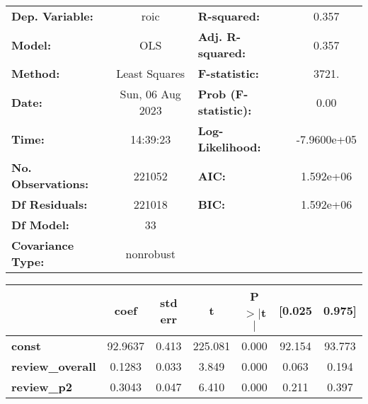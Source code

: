 \begin{center}
\begin{tabular}{lclc}
\toprule
\textbf{Dep. Variable:}                                               &       roic       & \textbf{  R-squared:         } &      0.357   \\
\textbf{Model:}                                                       &       OLS        & \textbf{  Adj. R-squared:    } &      0.357   \\
\textbf{Method:}                                                      &  Least Squares   & \textbf{  F-statistic:       } &      3721.   \\
\textbf{Date:}                                                        & Sun, 06 Aug 2023 & \textbf{  Prob (F-statistic):} &      0.00    \\
\textbf{Time:}                                                        &     14:39:23     & \textbf{  Log-Likelihood:    } & -7.9600e+05  \\
\textbf{No. Observations:}                                            &      221052      & \textbf{  AIC:               } &  1.592e+06   \\
\textbf{Df Residuals:}                                                &      221018      & \textbf{  BIC:               } &  1.592e+06   \\
\textbf{Df Model:}                                                    &          33      & \textbf{                     } &              \\
\textbf{Covariance Type:}                                             &    nonrobust     & \textbf{                     } &              \\
\bottomrule
\end{tabular}
\begin{tabular}{lcccccc}
                                                                      & \textbf{coef} & \textbf{std err} & \textbf{t} & \textbf{P$> |$t$|$} & \textbf{[0.025} & \textbf{0.975]}  \\
\midrule
\textbf{const}                                                        &      92.9637  &        0.413     &   225.081  &         0.000        &       92.154    &       93.773     \\
\textbf{review\_overall}                                              &       0.1283  &        0.033     &     3.849  &         0.000        &        0.063    &        0.194     \\
\textbf{review\_p2}                                                   &       0.3043  &        0.047     &     6.410  &         0.000        &        0.211    &        0.397     \\

\end{tabular}
\end{center}

